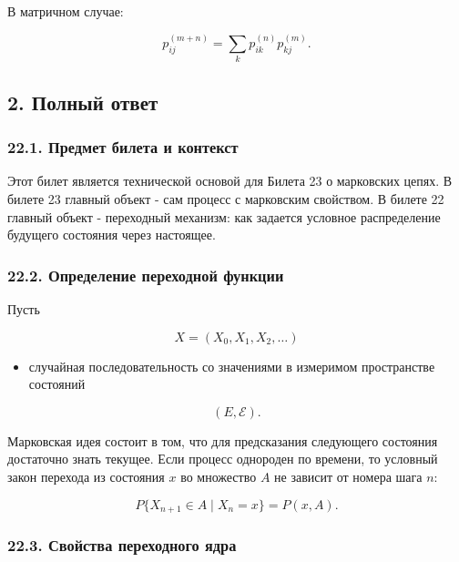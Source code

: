 \documentclass[
  11pt,
  a4paper,
]{article}
\providecommand{\tightlist}{%
  \setlength{\itemsep}{0pt}\setlength{\parskip}{0pt}}
\begin{document}
В матричном случае:

\[
p_{ij}^{(m+n)}
=
\sum_k p_{ik}^{(n)}p_{kj}^{(m)}.
\]

\subsection{2. Полный
ответ}\label{ux43fux43eux43bux43dux44bux439-ux43eux442ux432ux435ux442}

\subsubsection{22.1. Предмет билета и
контекст}\label{ux43fux440ux435ux434ux43cux435ux442-ux431ux438ux43bux435ux442ux430-ux438-ux43aux43eux43dux442ux435ux43aux441ux442}

Этот билет является технической основой для Билета 23 о марковских
цепях. В билете 23 главный объект - сам процесс с марковским свойством.
В билете 22 главный объект - переходный механизм: как задается условное
распределение будущего состояния через настоящее.

\subsubsection{22.2. Определение переходной
функции}\label{ux43eux43fux440ux435ux434ux435ux43bux435ux43dux438ux435-ux43fux435ux440ux435ux445ux43eux434ux43dux43eux439-ux444ux443ux43dux43aux446ux438ux438}

Пусть

\[
X=(X_0,X_1,X_2,\ldots)
\]

\begin{itemize}
\tightlist
\item
  случайная последовательность со значениями в измеримом пространстве
  состояний
\end{itemize}

\[
(E,\mathcal E).
\]

Марковская идея состоит в том, что для предсказания следующего состояния
достаточно знать текущее. Если процесс однороден по времени, то условный
закон перехода из состояния \(x\) во множество \(A\) не зависит от
номера шага \(n\):

\[
P\{X_{n+1}\in A\mid X_n=x\}=P(x,A).
\]

\subsubsection{22.3. Свойства переходного
ядра}\label{ux441ux432ux43eux439ux441ux442ux432ux430-ux43fux435ux440ux435ux445ux43eux434ux43dux43eux433ux43e-ux44fux434ux440ux430}
\end{document}
